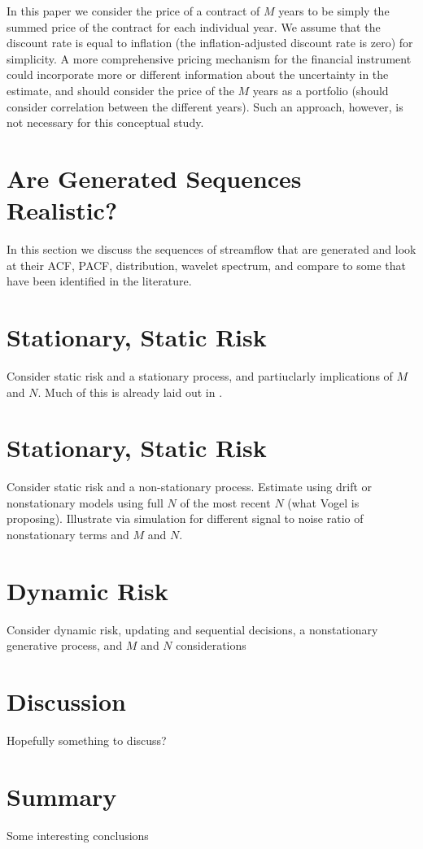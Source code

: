 \documentclass[11pt]{article}
\begin{document}
In this paper we consider the price of a contract of $M$ years to be simply the summed price of the contract for each individual year.
We assume that the discount rate is equal to inflation (\ie the inflation-adjusted discount rate is zero) for simplicity.
A more comprehensive pricing mechanism for the financial instrument could incorporate more or different information about the uncertainty in the estimate, and should consider the price of the $M$ years as a portfolio (\ie should consider correlation between the different years).
Such an approach, however, is not necessary for this conceptual study.

\section{Are Generated Sequences Realistic? \label{sec:sequence-realistic}}

In this section we discuss the sequences of streamflow that are generated and look at their ACF, PACF, distribution, wavelet spectrum, \etc and compare to some that have been identified in the literature.


\section{Stationary, Static Risk}

Consider static risk and a stationary process, and partiuclarly implications of $M$ and $N$.
Much of this is already laid out in \citet{Lall1987}.

\section{Stationary, Static Risk}

Consider static risk and a non-stationary process.
Estimate using drift or nonstationary models using full $N$ of the most recent $N$ (\ie what Vogel is proposing).
Illustrate via simulation for different signal to noise ratio of nonstationary terms and $M$ and $N$.

\section{Dynamic Risk}

Consider dynamic risk, \ie updating and sequential decisions, a nonstationary generative process, and $M$ and $N$ considerations

\section{Discussion}

Hopefully something to discuss?

\section{Summary}

Some interesting conclusions



\clearpage
\printbibliography
\end{document}
